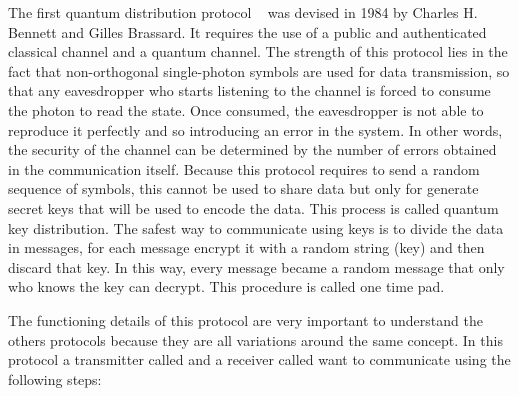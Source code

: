 The first quantum distribution protocol ~\cite{a9} was devised in 1984 by Charles H. Bennett and Gilles Brassard. It requires the use of a public and authenticated classical channel and a quantum channel. The strength of this protocol lies in the fact that non-orthogonal single-photon symbols are used for data transmission, so that any eavesdropper who starts listening to the channel is forced to consume the photon to read the state. Once consumed, the eavesdropper is not able to reproduce it perfectly and so introducing an error in the system. In other words, the security of the channel can be determined by the number of errors obtained in the communication itself. Because this protocol requires to send a random sequence of symbols, this cannot be used to share data but only for generate secret keys that will be used to encode the data. This process is called quantum key distribution. The safest way to communicate using keys is to divide the data in messages, for each message encrypt it with a random string (key) and then discard that key. In this way, every message became a random message that only who knows the key can decrypt. This procedure is called one time pad.

The functioning details of this protocol are very important to understand the others protocols because they are all variations around the same concept. In this protocol a transmitter called  and a receiver called  want to communicate using the following steps:

